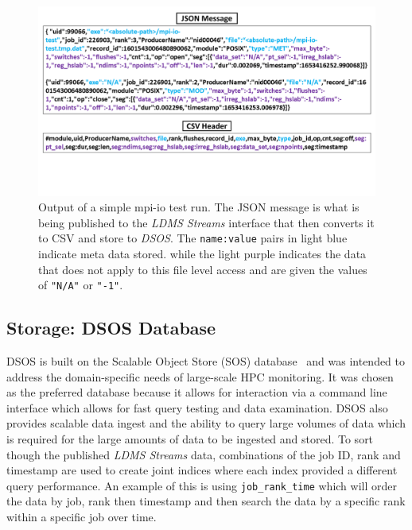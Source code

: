 \begin{figure}
	\centering
	\includegraphics[trim={0 4cm 0 0},clip, width=1\linewidth]{figs/darshan-csv-json.png}
	\caption{Output of a simple mpi-io test run. The JSON message is what is being published to the \emph{LDMS Streams} interface that then converts it to CSV and store to \emph{DSOS}. The \texttt{name:value} pairs in light blue indicate meta data stored. while the light purple indicates the data that does not apply to this file level access and are given the values of \texttt{"N/A"} or \texttt{"-1"}.}
	\label{f:CSV Header and Output}
\end{figure}

\subsection{Storage: DSOS Database}
DSOS is built on the Scalable Object Store (SOS) database~\cite{sosgithub} and was intended to address the domain-specific needs of large-scale HPC monitoring. It was chosen as the preferred database because it allows for interaction via a command line interface which allows for fast query testing and data examination. DSOS also provides scalable data ingest and the ability to query large volumes of data which is required for the large amounts of data to be ingested and stored. %
To sort though the published \emph{LDMS Streams} data, combinations of the job ID, rank and timestamp are used to create joint indices where each index provided a different query performance. An example of this is using \texttt{job\_rank\_time} which will order the data by job, rank then timestamp and then search the data by a specific rank within a specific job over time.

